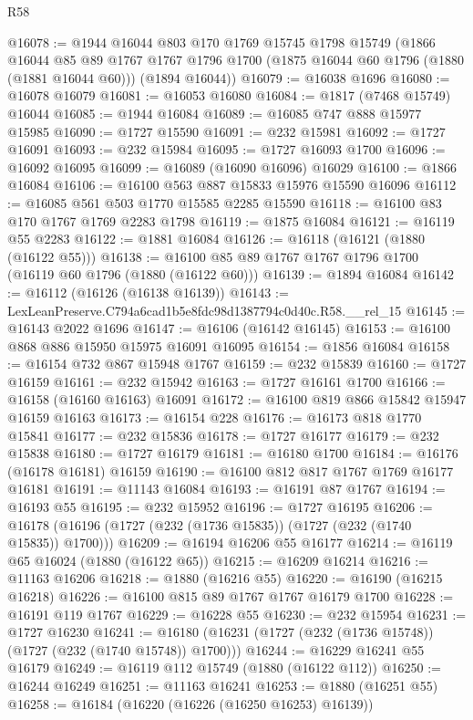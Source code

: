 \begin{lexlean}{R58}
\begin{coremodule}
@16078 := @1944
    @16044
    @803
    @170
    @1769
    @15745
    @1798
    @15749
    (@1866
      @16044
      @85
      @89
      @1767
      @1767
      @1796
      @1700
      (@1875 @16044 @60 @1796 (@1880 (@1881 @16044 @60)))
      (@1894 @16044))
@16079 := @16038 @1696
@16080 := @16078 @16079
@16081 := @16053 @16080
@16084 := @1817 (@7468 @15749) @16044
@16085 := @1944 @16084
@16089 := @16085 @747 @888 @15977 @15985
@16090 := @1727 @15590
@16091 := @232 @15981
@16092 := @1727 @16091
@16093 := @232 @15984
@16095 := @1727 @16093 @1700
@16096 := @16092 @16095
@16099 := @16089 (@16090 @16096) @16029
@16100 := @1866 @16084
@16106 := @16100 @563 @887 @15833 @15976 @15590 @16096
@16112 := @16085 @561 @503 @1770 @15585 @2285 @15590
@16118 := @16100 @83 @170 @1767 @1769 @2283 @1798
@16119 := @1875 @16084
@16121 := @16119 @55 @2283
@16122 := @1881 @16084
@16126 := @16118 (@16121 (@1880 (@16122 @55)))
@16138 := @16100 @85 @89 @1767 @1767 @1796 @1700 (@16119 @60 @1796 (@1880 (@16122 @60)))
@16139 := @1894 @16084
@16142 := @16112 (@16126 (@16138 @16139))
@16143 := LexLeanPreserve.C794a6cad1b5e8fdc98d1387794c0d40c.R58.__rel_15
@16145 := @16143 @2022 @1696
@16147 := @16106 (@16142 @16145)
@16153 := @16100 @868 @886 @15950 @15975 @16091 @16095
@16154 := @1856 @16084
@16158 := @16154 @732 @867 @15948 @1767
@16159 := @232 @15839
@16160 := @1727 @16159
@16161 := @232 @15942
@16163 := @1727 @16161 @1700
@16166 := @16158 (@16160 @16163) @16091
@16172 := @16100 @819 @866 @15842 @15947 @16159 @16163
@16173 := @16154 @228
@16176 := @16173 @818 @1770 @15841
@16177 := @232 @15836
@16178 := @1727 @16177
@16179 := @232 @15838
@16180 := @1727 @16179
@16181 := @16180 @1700
@16184 := @16176 (@16178 @16181) @16159
@16190 := @16100 @812 @817 @1767 @1769 @16177 @16181
@16191 := @11143 @16084
@16193 := @16191 @87 @1767
@16194 := @16193 @55
@16195 := @232 @15952
@16196 := @1727 @16195
@16206 := @16178 (@16196 (@1727 (@232 (@1736 @15835)) (@1727 (@232 (@1740 @15835)) @1700)))
@16209 := @16194 @16206 @55 @16177
@16214 := @16119 @65 @16024 (@1880 (@16122 @65))
@16215 := @16209 @16214
@16216 := @11163 @16206
@16218 := @1880 (@16216 @55)
@16220 := @16190 (@16215 @16218)
@16226 := @16100 @815 @89 @1767 @1767 @16179 @1700
@16228 := @16191 @119 @1767
@16229 := @16228 @55
@16230 := @232 @15954
@16231 := @1727 @16230
@16241 := @16180 (@16231 (@1727 (@232 (@1736 @15748)) (@1727 (@232 (@1740 @15748)) @1700)))
@16244 := @16229 @16241 @55 @16179
@16249 := @16119 @112 @15749 (@1880 (@16122 @112))
@16250 := @16244 @16249
@16251 := @11163 @16241
@16253 := @1880 (@16251 @55)
@16258 := @16184 (@16220 (@16226 (@16250 @16253) @16139))

\end{coremodule}
\end{lexlean}

